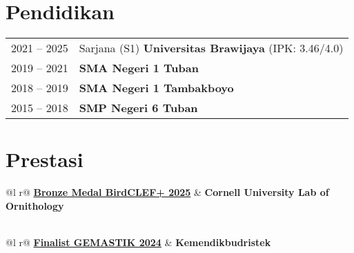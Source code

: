 \documentclass[a4paper,12pt]{article}
\begin{document}
\section{Pendidikan}
\begin{tabularx}{\linewidth}{@{}l X@{}}
2021 -- 2025 & Sarjana (S1) \textbf{Universitas Brawijaya} \hfill (IPK: 3.46/4.0) \\ 
2019 -- 2021 & \textbf{SMA Negeri 1 Tuban} \\
2018 -- 2019 & \textbf{SMA Negeri 1 Tambakboyo} \\
2015 -- 2018 & \textbf{SMP Negeri 6 Tuban} \\
\end{tabularx}

\section{Prestasi}
\hypersetup{hidelinks}

\begin{tabularx}{\linewidth}{ @{}l r@{} }
\textbf{\href{https://drive.google.com/file/d/1HlHqBQiY5aCp8P5qI-VP7Qo11Sv0Op5J/view?usp=drive_link}{Bronze Medal BirdCLEF+ 2025}} & \hfill \textbf{Cornell University Lab of Ornithology} \\[3.75pt]
  \\
\end{tabularx}

\begin{tabularx}{\linewidth}{ @{}l r@{} }
\textbf{\href{https://drive.google.com/file/d/1IgvW4PnoxvhXLq-yllY7VhY5LpvlcQp-/view?usp=drive_link}{Finalist GEMASTIK 2024}} & \hfill \textbf{Kemendikbudristek} \\[3.75pt]
  \\
\end{tabularx}
\end{document}
